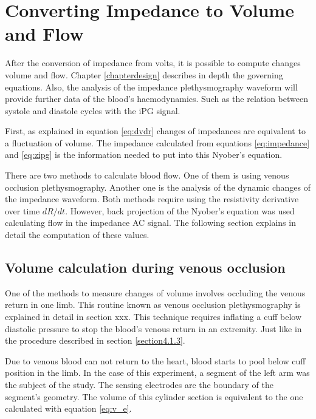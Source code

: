 \section{Converting Impedance to Volume and Flow}
\label{section procedure 3}

After the conversion of impedance from volts, it is possible to compute changes volume and flow. Chapter \ref{chapterdesign} describes in depth the governing equations. Also, the analysis of the impedance plethysmography waveform will provide further data of the blood's haemodynamics. Such as the relation between systole and diastole cycles with the iPG signal.

First, as explained in equation \ref{eq:dvdr} changes of impedances are equivalent to a fluctuation of volume.  The impedance calculated from equations \ref{eq:impedance} and \ref{eq:zipg} is the information needed to put into this Nyober's equation.

There are two methods to calculate blood flow. One of them is using venous occlusion plethysmography. Another one is the analysis of the dynamic changes of the impedance waveform. Both methods require using the resistivity derivative over time $dR/dt$. However, back projection of the Nyober's equation was used calculating flow in the impedance AC signal. The following section explains in detail the computation of these values.  


\subsection{Volume calculation during venous occlusion}
\label{section.4.3.1}
One of the methods to measure changes of volume involves occluding the venous return in one limb. This routine known as venous occlusion plethysmography is explained in detail in section xxx. This technique requires inflating a cuff below diastolic pressure to stop the blood's venous return in an extremity. Just like in the procedure described in section \ref{section4.1.3}. 


Due to venous blood can not return to the heart, blood starts to pool below cuff position in the limb. In the case of this experiment, a segment of the left arm was the subject of the study. The sensing electrodes are the boundary of the segment's geometry. The volume of this cylinder section is equivalent to the one calculated with equation \ref{eq:v_e}. 

